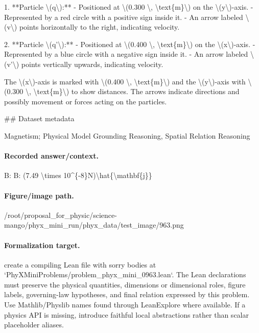1. **Particle \textbackslash{}(q\textbackslash{}):** 
   - Positioned at \textbackslash{}(0.300 \textbackslash{}, \textbackslash{}text\{m\}\textbackslash{}) on the \textbackslash{}(y\textbackslash{})-axis.
   - Represented by a red circle with a positive sign inside it.
   - An arrow labeled \textbackslash{}(v\textbackslash{}) points horizontally to the right, indicating velocity.

2. **Particle \textbackslash{}(q'\textbackslash{}):**
   - Positioned at \textbackslash{}(0.400 \textbackslash{}, \textbackslash{}text\{m\}\textbackslash{}) on the \textbackslash{}(x\textbackslash{})-axis.
   - Represented by a blue circle with a negative sign inside it.
   - An arrow labeled \textbackslash{}(v'\textbackslash{}) points vertically upwards, indicating velocity.

The \textbackslash{}(x\textbackslash{})-axis is marked with \textbackslash{}(0.400 \textbackslash{}, \textbackslash{}text\{m\}\textbackslash{}) and the \textbackslash{}(y\textbackslash{})-axis with \textbackslash{}(0.300 \textbackslash{}, \textbackslash{}text\{m\}\textbackslash{}) to show distances. The arrows indicate directions and possibly movement or forces acting on the particles.

\#\# Dataset metadata

Magnetism; Physical Model Grounding Reasoning, Spatial Relation Reasoning

\paragraph{Recorded answer/context.}
B: B: (7.49 \textbackslash{}times 10\textasciicircum{}\{-8\}N)\textbackslash{}hat\{\textbackslash{}mathbf\{j\}\}

\paragraph{Figure/image path.}
/root/proposal\_for\_physic/science-mango/phyx\_mini\_run/phyx\_data/test\_image/963.png

\paragraph{Formalization target.}
create a compiling Lean file with sorry bodies at `PhyXMiniProblems/problem\_phyx\_mini\_0963.lean`. The Lean declarations must preserve the physical quantities, dimensions or dimensional roles, figure labels, governing-law hypotheses, and final relation expressed by this problem.
Use Mathlib/Physlib names found through LeanExplore where available. If a physics API is missing, introduce faithful local abstractions rather than scalar placeholder aliases.


